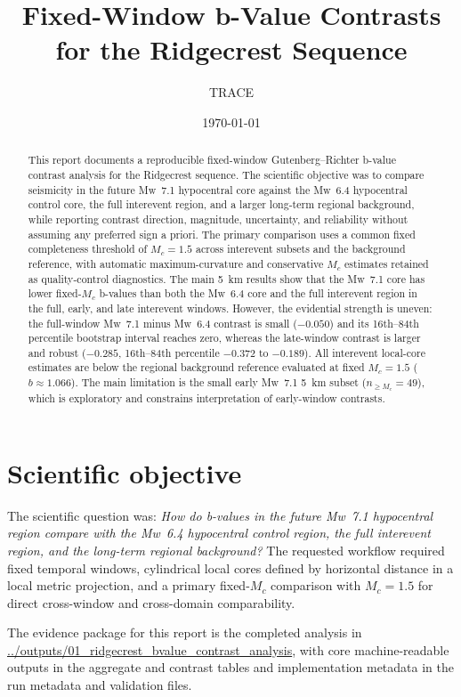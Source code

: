 \documentclass[11pt]{article}
\title{Fixed-Window b-Value Contrasts for the Ridgecrest Sequence}
\author{TRACE}
\date{\today}
\begin{document}
\maketitle

\begin{abstract}
This report documents a reproducible fixed-window Gutenberg--Richter b-value contrast analysis for the Ridgecrest sequence. The scientific objective was to compare seismicity in the future Mw~7.1 hypocentral core against the Mw~6.4 hypocentral control core, the full interevent region, and a larger long-term regional background, while reporting contrast direction, magnitude, uncertainty, and reliability without assuming any preferred sign a priori. The primary comparison uses a common fixed completeness threshold of $M_c=1.5$ across interevent subsets and the background reference, with automatic maximum-curvature and conservative $M_c$ estimates retained as quality-control diagnostics. The main 5~km results show that the Mw~7.1 core has lower fixed-$M_c$ b-values than both the Mw~6.4 core and the full interevent region in the full, early, and late interevent windows. However, the evidential strength is uneven: the full-window Mw~7.1 minus Mw~6.4 contrast is small ($-0.050$) and its 16th--84th percentile bootstrap interval reaches zero, whereas the late-window contrast is larger and robust ($-0.285$, 16th--84th percentile $-0.372$ to $-0.189$). All interevent local-core estimates are below the regional background reference evaluated at fixed $M_c=1.5$ ($b\approx 1.066$). The main limitation is the small early Mw~7.1 5~km subset ($n_{\ge M_c}=49$), which is exploratory and constrains interpretation of early-window contrasts.
\end{abstract}

\section{Scientific objective}
The scientific question was: \emph{How do b-values in the future Mw~7.1 hypocentral region compare with the Mw~6.4 hypocentral control region, the full interevent region, and the long-term regional background?} The requested workflow required fixed temporal windows, cylindrical local cores defined by horizontal distance in a local metric projection, and a primary fixed-$M_c$ comparison with $M_c=1.5$ for direct cross-window and cross-domain comparability.

The evidence package for this report is the completed analysis in
\url{../outputs/01_ridgecrest_bvalue_contrast_analysis},
with core machine-readable outputs in the aggregate and contrast tables and implementation metadata in the run metadata and validation files.
\end{document}
